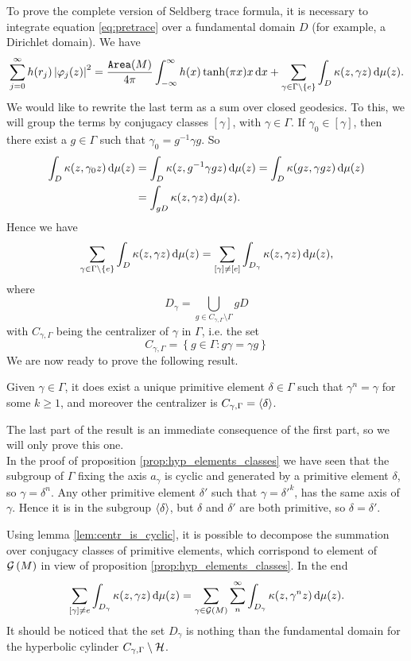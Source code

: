 To prove the complete version of Seldberg trace formula, it is necessary to integrate equation \eqref{eq:pretrace} over a fundamental domain $D$ (for example, a Dirichlet domain). We have 
\[
\sum_{j=0}^{\infty}h(r_{j})\left| \varphi_{j}(z)\right|^{2}=\frac{\operatorname{\mathtt{Area}}(M)}{4\pi}\int_{-\infty}^{\infty}h(x)\tanh(\pi x)x\mathop{}\!\mathrm{d} x+\sum_{\gamma\in\Gamma\setminus\{e\}}\int_{D}\kappa(z,\gamma z)\mathop{}\!\mathrm{d}\mu(z).
\]
We would like to rewrite the last term as a sum over closed geodesics. To this, we will group the terms by conjugacy classes $[\gamma]$, with $\gamma\in\Gamma$. If $\gamma_{0}\in [\gamma]$, then there exist a $g\in\Gamma$ such that $\gamma_{0}=g^{-1}\gamma g$. So
\begin{align*}
\int_{D}\kappa(z,\gamma_{0} z)\mathop{}\!\mathrm{d}\mu(z)&=\int_{D}\kappa(z,g^{-1}\gamma g z)\mathop{}\!\mathrm{d}\mu(z)=\int_{D}\kappa(gz,\gamma gz)\mathop{}\!\mathrm{d}\mu(z)\\
&=\int_{gD}\kappa(z,\gamma z)\mathop{}\!\mathrm{d}\mu(z).
\end{align*}
Hence we have
\[
\sum_{\gamma\in\Gamma\setminus\{e\}}\int_{D}\kappa(z,\gamma z)\mathop{}\!\mathrm{d}\mu(z)=\sum_{[\gamma]\neq[e]}\int_{D_{\gamma}}\kappa(z,\gamma z)\mathop{}\!\mathrm{d}\mu(z),
\]
where 
\[
D_{\gamma}=\bigcup_{g\in C_{\gamma,\Gamma}\setminus\Gamma} gD
\]
with $C_{\gamma,\Gamma}$ being the centralizer of $\gamma$ in $\Gamma$, i.e. the set 
\begin{equation}
\label{eq:centralizer}
C_{\gamma,\Gamma}=\left\{
g\in\Gamma\colon g\gamma=\gamma g
\right\}
\end{equation}
We are now ready to prove the following result.

\begin{nlem}
\label{lem:centr_is_cyclic}
Given $\gamma\in\Gamma$, it does exist a unique primitive element $\delta\in\Gamma$ such that $\gamma^{n}=\gamma$ for some $k\geq1$, and moreover the centralizer is $C_{\gamma,\Gamma}=\left< \delta\right>$.
\end{nlem}
\begin{prf}
The last part of the result is an immediate consequence of the first part, so we will only prove this one.\\
In the proof of proposition \ref{prop:hyp_elements_classes} we have seen that the subgroup of $\Gamma$ fixing the axis $a_{\gamma}$ is cyclic and generated by a primitive element $\delta$, so $\gamma=\delta^{n}$. Any other primitive element $\delta'$ such that $\gamma=\delta'^{k}$, has the same axis of $\gamma$. Hence it is in the subgroup $\left< \delta\right>$, but $\delta$ and $\delta'$ are both primitive, so $\delta=\delta'$.
\end{prf}
Using lemma \ref{lem:centr_is_cyclic}, it is possible to decompose the summation over conjugacy classes of
primitive elements, which corrispond to element of $\mathcal{G}\left(M\right)$ in view of proposition \ref{prop:hyp_elements_classes}. In the end
\[
\sum_{[\gamma]\neq e}\int_{D_{\gamma}}\kappa(z,\gamma z)\mathop{}\!\mathrm{d}\mu(z) = \sum_{\gamma\in\mathcal{G}\left(M\right)}\sum_{n}^{\infty}\int_{D_{\gamma}}\kappa(z,\gamma^{n}z)\mathop{}\!\mathrm{d}\mu(z).
\]
It should be noticed that the set $D_{\gamma}$ is nothing than the fundamental domain for the hyperbolic cylinder $C_{\gamma,\Gamma}\setminus\mathcal{H}$.


